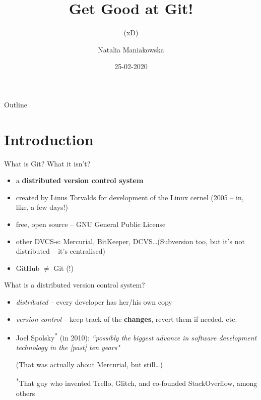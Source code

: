 \documentclass{beamer}
\title{Get Good at Git!}
\subtitle{\tiny{(xD)}}
\author{Natalia Maniakowska}
\institute{skygate}
\date{25-02-2020}
\begin{document}
    \frame{\titlepage}

    \begin{frame}{Outline}
        \tableofcontents
    \end{frame}


    \section{Introduction}


    \begin{frame}{What is Git? What it isn't?}
        \begin{itemize}
            \item a \textbf{distributed version control system}
            \item created by Linus Torvalds for development of the Linux cernel (2005 -- in, like, a few days!)
            \item free, open source -- GNU General Public License
            \item other DVCS-s: Mercurial, BitKeeper, DCVS\dots (Subversion too, but it's not distributed -- it's centralised)
            \item GitHub $\neq$ Git (!)
        \end{itemize}

    \end{frame}


    \begin{frame}{What is a distributed version control system?}
        \begin{itemize}
            \item \textit{distributed} -- every developer has her/his own copy
            \item \textit{version control} -- keep track of the \textbf{changes}, revert them if needed, etc.
            \item Joel Spolsky\textsuperscript{*} (in 2010): \emph{``possibly the biggest advance in software development technology in the [past] ten years"}
            \href{https://www.joelonsoftware.com/2010/03/17/distributed-version-control-is-here-to-stay-baby}{}

            \footnotesize{(That was actually about Mercurial, but still\dots)}

            \footnotesize{\textsuperscript{*}That guy who invented Trello, Glitch, and co-founded StackOverflow, among others}
        \end{itemize}

    \end{frame}
\end{document}
